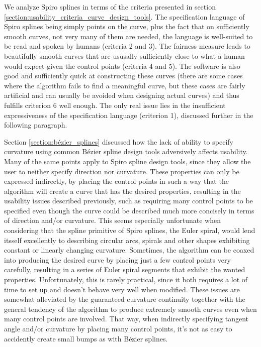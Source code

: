 \documentclass[a4paper]{article}
\begin{document}
				We analyze Spiro splines in terms of the criteria presented in section \ref{section:usability_criteria_curve_design_tools}. The specification language of Spiro splines being simply points on the curve, plus the fact that on sufficiently smooth curves, not very many of them are needed, the language is well-suited to be read and spoken by humans (criteria 2 and 3). The fairness measure leads to beautifully smooth curves that are ususally sufficiently close to what a human would expect given the control points (criteria 4 and 5). The software is also good and sufficiently quick at constructing these curves (there are some cases where the algorithm fails to find a meaningful curve, but these cases are fairly artificial and can usually be avoided when designing actual curves) and thus fulfills criterion 6 well enough. The only real issue lies in the insufficient expressiveness of the specification language (criterion 1), discussed further in the following paragraph.

				Section \ref{section:bézier_splines} discussed how the lack of ability to specify curvature using common Bézier spline design tools adversively affects usability. Many of the same points apply to Spiro spline design tools, since they allow the user to neither specify direction nor curvature. These properties can only be expressed indirectly, by placing the control points in such a way that the algorithm will create a curve that has the desired properties, resulting in the usability issues described previously, such as requiring many control points to be specified even though the curve could be described much more concisely in terms of direction and/or curvature. This seems especially unfortunate when considering that the spline primitive of Spiro splines, the Euler spiral, would lend itsself excellently to describing circular arcs, spirals and other shapes exhibiting constant or linearly changing curvature. Sometimes, the algorithm can be coaxed into producing the desired curve by placing just a few control points very carefully, resulting in a series of Euler spiral segments that exhibit the wanted properties. Unfortunately, this is rarely practical, since it both requires a lot of time to set up and doesn't behave very well when modified. These issues are somewhat alleviated by the guaranteed curvature continuity together with the general tendency of the algorithm to produce extremely smooth curves even when many control points are involved. That way, when indirectly specifying tangent angle and/or curvature by placing many control points, it's not as easy to accidently create small bumps as with Bézier splines.
\end{document}
